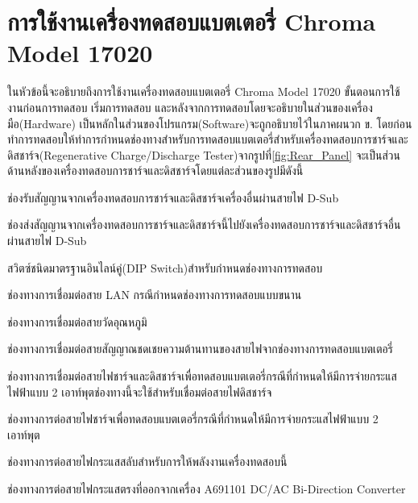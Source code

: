 \section{การใช้งานเครื่องทดสอบแบตเตอรี่ Chroma Model 17020}
ในหัวข้อนี้จะอธิบายถึงการใช้งานเครื่องทดสอบแบตเตอรี่ Chroma Model 17020 ขั้นตอนการใช้งานก่อนการทดสอบ เริ่มการทดสอบ และหลังจากการทดสอบโดยจะอธิบายในส่วนของเครื่องมือ(Hardware)
เป็นหลักในส่วนของโปรแกรม(Software)จะถูกอธิบายไว้ในภาคผนวก ข. โดยก่อนทำการทดสอบให้ทำการกำหนดช่องทางสำหรับการทดสอบแบตเตอรี่สำหรับเครื่องทดสอบการชาร์จและดิสชาร์จ(Regenerative Charge/Discharge Tester)จากรูปที่\ref{fig:Rear_Panel} จะเป็นส่วนด้านหลังของเครื่องทดสอบการชาร์จและดิสชาร์จโดยแต่ละส่วนของรูปมีดังนี้
\begin{enumerate}
{\item ช่องรับสัญญานจากเครื่องทดสอบการชาร์จและดิสชาร์จเครื่องอื่นผ่านสายไฟ D-Sub}
{\item ช่องส่งสัญญานจากเครื่องทดสอบการชาร์จและดิสชาร์จนี้ไปยังเครื่องทดสอบการชาร์จและดิสชาร์จอื่นผ่านสายไฟ D-Sub}
{\item สวิตซ์ชนิดมาตรฐานอินไลน์คู่(DIP Switch)สำหรับกำหนดช่องทางการทดสอบ}
{\item ช่องทางการเชื่อมต่อสาย LAN กรณีกำหนดช่องทางการทดสอบแบบขนาน}
{\item ช่องทางการเชื่อมต่อสายวัดอุณหภูมิ}
{\item ช่องทางการเชื่อมต่อสายสัญญาณชดเชยความต้านทานของสายไฟจากช่องทางการทดสอบแบตเตอรี่}
{\item ช่องทางการเชื่อมต่อสายไฟชาร์จและดิสชาร์จเพื่อทดสอบแบตเตอรี่กรณีที่กำหนดให้มีการจ่ายกระแสไฟฟ้าแบบ 2 เอาท์พุตช่องทางนี้จะใช้สำหรับเชื่อมต่อสายไฟดิสชาร์จ}
{\item ช่องทางการต่อสายไฟชาร์จเพื่อทดสอบแบตเตอรี่กรณีที่กำหนดให้มีการจ่ายกระแสไฟฟ้าแบบ 2 เอาท์พุต}
{\item ช่องทางการต่อสายไฟกระแสสลับสำหรับการให้พลังงานเครื่องทดสอบนี้}
{\item ช่องทางการต่อสายไฟกระแสตรงที่ออกจากเครื่อง A691101 DC/AC Bi-Direction Converter}
\end{enumerate}
